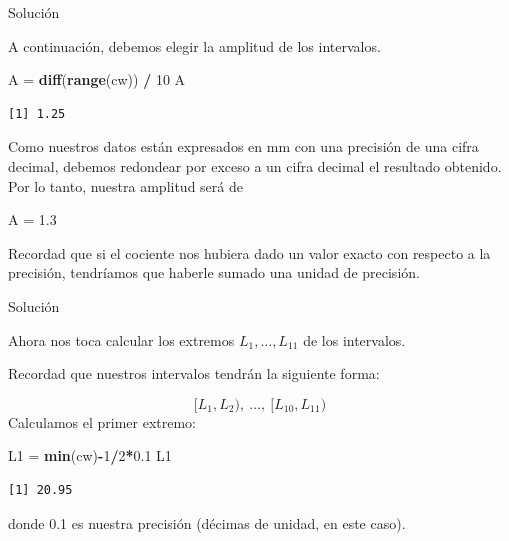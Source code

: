 \documentclass[
  ignorenonframetext,
]{beamer}
\newenvironment{Shaded}{\begin{snugshade}}{\end{snugshade}}
\newcommand{\DecValTok}[1]{\textcolor[rgb]{0.00,0.00,0.81}{#1}}
\newcommand{\FloatTok}[1]{\textcolor[rgb]{0.00,0.00,0.81}{#1}}
\newcommand{\KeywordTok}[1]{\textcolor[rgb]{0.13,0.29,0.53}{\textbf{#1}}}
\newcommand{\NormalTok}[1]{#1}
\newcommand{\OperatorTok}[1]{\textcolor[rgb]{0.81,0.36,0.00}{\textbf{#1}}}
\newcommand{\StringTok}[1]{\textcolor[rgb]{0.31,0.60,0.02}{#1}}
\begin{document}
\begin{frame}[fragile]{Solución}
\protect\hypertarget{soluciuxf3n-4}{}

A continuación, debemos elegir la amplitud de los intervalos.

\begin{Shaded}
\begin{Highlighting}[]
\NormalTok{A =}\StringTok{ }\KeywordTok{diff}\NormalTok{(}\KeywordTok{range}\NormalTok{(cw)) }\OperatorTok{/}\StringTok{ }\DecValTok{10}
\NormalTok{A}
\end{Highlighting}
\end{Shaded}

\begin{verbatim}
[1] 1.25
\end{verbatim}

Como nuestros datos están expresados en mm con una precisión de una
cifra decimal, debemos redondear por exceso a un cifra decimal el
resultado obtenido. Por lo tanto, nuestra amplitud será de

\begin{Shaded}
\begin{Highlighting}[]
\NormalTok{A =}\StringTok{ }\FloatTok{1.3}
\end{Highlighting}
\end{Shaded}

Recordad que si el cociente nos hubiera dado un valor exacto con
respecto a la precisión, tendríamos que haberle sumado una unidad de
precisión.

\end{frame}

\begin{frame}[fragile]{Solución}
\protect\hypertarget{soluciuxf3n-5}{}

Ahora nos toca calcular los extremos \(L_1,\dots,L_{11}\) de los
intervalos.

Recordad que nuestros intervalos tendrán la siguiente forma:

\[[L_1,L_2),\ \dots,\ [L_{10},L_{11})\] Calculamos el primer extremo:

\begin{Shaded}
\begin{Highlighting}[]
\NormalTok{L1 =}\StringTok{ }\KeywordTok{min}\NormalTok{(cw)}\OperatorTok{-}\DecValTok{1}\OperatorTok{/}\DecValTok{2}\OperatorTok{*}\FloatTok{0.1}
\NormalTok{L1}
\end{Highlighting}
\end{Shaded}

\begin{verbatim}
[1] 20.95
\end{verbatim}

donde 0.1 es nuestra precisión (décimas de unidad, en este caso).

\end{frame}
\end{document}
